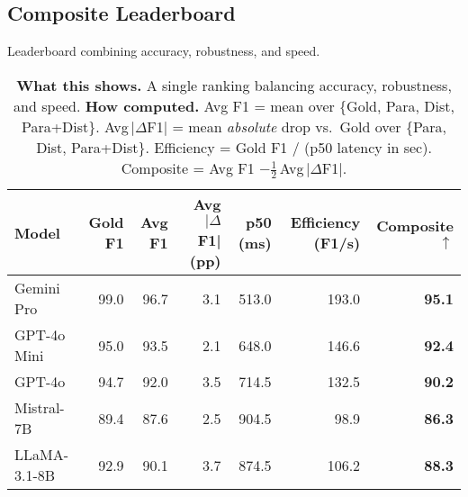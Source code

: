 \subsection{Composite Leaderboard}
\begin{table}[H]\centering
\caption{Leaderboard combining accuracy, robustness, and speed.}
\label{tab:leaderboard}
\small
\setlength{\tabcolsep}{5pt}
\renewcommand{\arraystretch}{1.08}
\begin{tabular}{lrrrrrr}
\toprule
Model & Gold F1 & Avg F1 & Avg $|\Delta$F1| (pp) & p50 (ms) & Efficiency (F1/s) & Composite $\uparrow$ \\
\midrule
Gemini Pro & 99.0 & 96.7 & 3.1 & 513.0 & 193.0 & \textbf{95.1} \\
GPT-4o Mini & 95.0 & 93.5 & 2.1 & 648.0 & 146.6 & \textbf{92.4} \\
GPT-4o & 94.7 & 92.0 & 3.5 & 714.5 & 132.5 & \textbf{90.2} \\
Mistral-7B & 89.4 & 87.6 & 2.5 & 904.5 & 98.9 & \textbf{86.3} \\
LLaMA-3.1-8B & 92.9 & 90.1 & 3.7 & 874.5 & 106.2 & \textbf{88.3} \\
\bottomrule
\end{tabular}
\caption*{\scriptsize
\textbf{What this shows.} A single ranking balancing accuracy, robustness, and speed.\;
\textbf{How computed.} Avg F1 = mean over \{Gold, Para, Dist, Para+Dist\}. 
Avg\,$|\Delta$F1| = mean \emph{absolute} drop vs.\ Gold over \{Para, Dist, Para+Dist\}. 
Efficiency = Gold F1 / (p50 latency in sec). 
Composite = Avg F1 $- \tfrac{1}{2}$\,Avg\,$|\Delta$F1|.}
\end{table}

